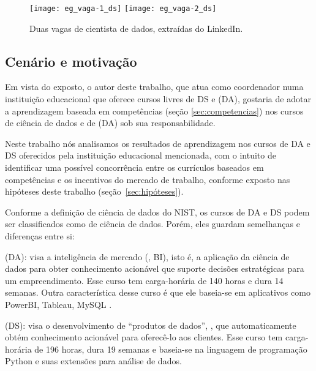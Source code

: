 \begin{figure}
	\texttt{[image: eg\_vaga-1\_ds]}\hfill
	\texttt{[image: eg\_vaga-2\_ds]}
	\caption{Duas vagas de cientista de dados, extraídas do LinkedIn.}
	\label{fig:vagas}
\end{figure}

\subsection{Cenário e motivação}

Em vista do exposto, o autor deste trabalho, que atua como coordenador numa instituição educacional que oferece cursos livres de DS e  (DA), gostaria de adotar a aprendizagem baseada em competências (seção \ref{sec:competencias}) nos cursos de ciência de dados e de  (DA) sob sua responsabilidade.

Neste trabalho nós analisamos os resultados de aprendizagem nos cursos de DA e DS oferecidos pela instituição educacional mencionada, com o intuito de identificar uma possível concorrência entre os currículos baseados em competências e os incentivos do mercado de trabalho, conforme exposto nas hipóteses deste trabalho (seção~\ref{sec:hipóteses}).

Conforme a definição de ciência de dados do NIST, os cursos de DA e DS podem ser classificados como de ciência de dados.
Porém, eles guardam semelhanças e diferenças entre si:
\begin{compactdesc}
	\item[\foreign{Data Analytics} (DA):] visa a inteligência de mercado (, BI), isto é, a aplicação da ciência de dados para obter conhecimento acionável que suporte decisões estratégicas para um empreendimento.
	Esse curso tem carga-horária de 140 horas e dura 14 semanas.
	Outra característica desse curso é que ele baseia-se em aplicativos como PowerBI, Tableau, MySQL \etc.

	\item[\foreign{Data Science} (DS):] visa o desenvolvimento de ``produtos de dados'', \ie,  que automaticamente obtém conhecimento acionável para oferecê-lo aos clientes.
	Esse curso tem carga-horária de 196 horas, dura 19 semanas e baseia-se na linguagem de programação Python e suas extensões para análise de dados.
\end{compactdesc}